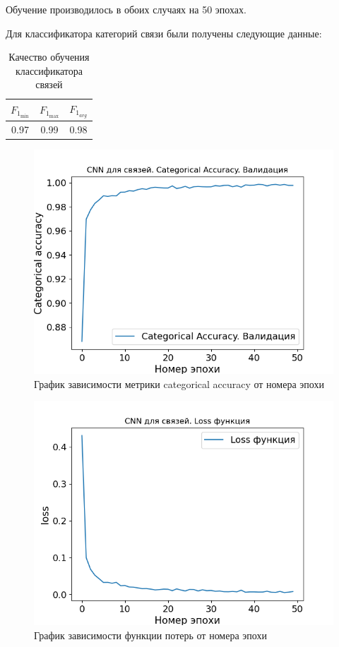 Обучение производилось в обоих случаях на 50 эпохах.

Для классификатора категорий связи были получены следующие данные:

\begin{table}[htbp]%
	\centering
	\label{tab:bond_quality}		
		\begin{tabular}{|c|c|c|}
			\hline
			$F_{1_{\min}}$ & $F_{1_{\max}}$ & $F_{1_{avg}}$ \\
			\hline
			0.97 & 0.99 & 0.98 \\
			\hline
		\end{tabular}
	\caption{Качество обучения классификатора связей}
\end{table}

\begin{figure}[ht!] 
	\center
	\includegraphics [scale=0.8] {my_folder/images/bonddir_accuracy}
	\caption{График зависимости метрики categorical accuracy от номера эпохи}
	\label{fig:AP50_bonddir_accuracy}
\end{figure}

\begin{figure}[ht!] 
	\center
	\includegraphics [scale=0.8] {my_folder/images/bonddir_loss}
	\caption{График зависимости функции потерь от номера эпохи}
	\label{fig:AP50_bonddir_loss}
\end{figure}

